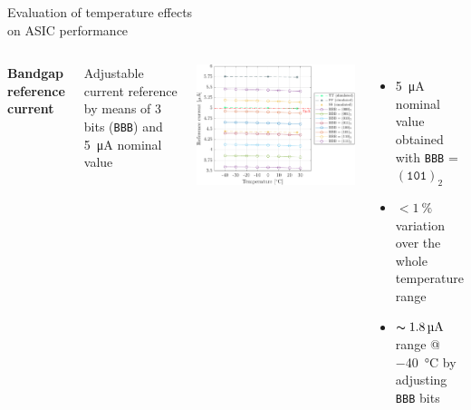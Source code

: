\documentclass[aspectratio=169,xcolor=dvipsnames]{beamer}
\newcommand{\greencheck}{{\color{ForestGreen}\checkmark}}
\begin{document}
\begin{frame}{Evaluation of temperature effects \\ \vskip-0.15cm on ASIC performance}
\begin{columns}[T]
        \addtolength{\leftmargini}{\labelsep}
        \vskip0.3cm
        \textbf{Bandgap reference current}\\
        \vskip0.15cm
    
        Adjustable current reference by means of 3 bits (\texttt{BBB}) and \SI{5}{\micro\ampere} nominal value

        \vskip-0.4cm
        \begin{center}
            \includegraphics[height=0.48\textheight]{images/temperature_effects/BGR_current_Xtemp_all-BBB.pdf}
        \end{center}

        \vskip-0.2cm
        \begin{itemize}
            \item \SI{5}{\micro\ampere} nominal value obtained with \texttt{BBB} = $(\texttt{101})_{2}$ \greencheck
            \item $< \SI{1}{\percent}$ variation over the whole temperature range \greencheck
            \item $\thicksim \SI{1.8}{\micro\ampere}$ range @ \SI{-40}{\celsius} by adjusting \texttt{BBB} bits \greencheck
        \end{itemize}
    
    \end{columns}
\end{frame}
\end{document}

